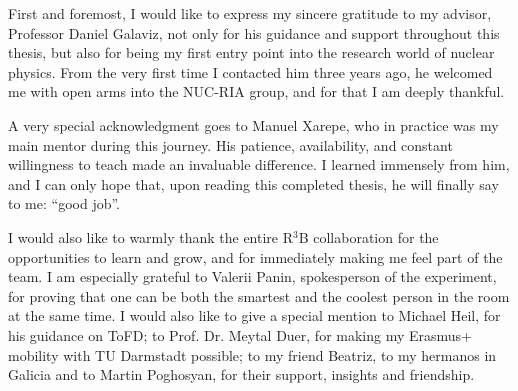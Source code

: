 
%

\begin{ntacknowledgements}

First and foremost, I would like to express my sincere gratitude to my advisor, Professor Daniel Galaviz, not only for his guidance and support throughout this thesis, but also for being my first entry point into the research world of nuclear physics. From the very first time I contacted him three years ago, he welcomed me with open arms into the NUC-RIA group, and for that I am deeply thankful.  

A very special acknowledgment goes to Manuel Xarepe, who in practice was my main mentor during this journey. His patience, availability, and constant willingness to teach made an invaluable difference. I learned immensely from him, and I can only hope that, upon reading this completed thesis, he will finally say to me: “good job”.  

I would also like to warmly thank the entire R$^3$B collaboration for the opportunities to learn and grow, and for immediately making me feel part of the team. I am especially grateful to Valerii Panin, spokesperson of the experiment, for proving that one can be both the smartest and the coolest person in the room at the same time. I would also like to give a special mention to Michael Heil, for his guidance on ToFD; to Prof. Dr. Meytal Duer, for making my Erasmus+ mobility with TU Darmstadt possible; to my friend Beatriz, to my hermanos in Galicia and to Martin Poghosyan, for their support, insights and friendship.  


\end{ntacknowledgements}
